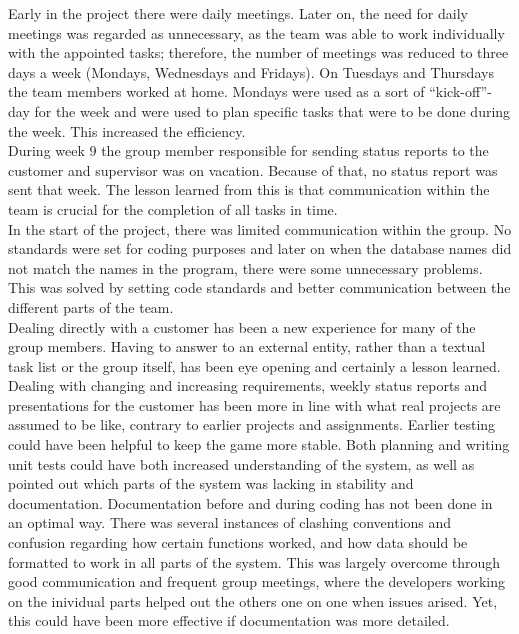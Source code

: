 Early in the project there were daily meetings. Later on, the need for daily meetings was regarded as unnecessary, as the team was able to work individually with the appointed tasks; therefore, the number of meetings was reduced to three days a week (Mondays, Wednesdays and Fridays). On Tuesdays and Thursdays the team members worked at home. Mondays were used as a sort of “kick-off”-day for the week and were used to plan specific tasks that were to be done during the week. This increased the efficiency.\\
\newline
During week 9 the group member responsible for sending status reports to the customer and supervisor was on vacation. Because of that, no status report was sent that week. The lesson learned from this is that communication within the team is crucial for the completion of all tasks in time.\\
\newline
In the start of the project, there was limited communication within the group. No standards were set
for coding purposes and later on when the database names did not match the names in the program, there were some unnecessary problems. This was solved by setting code standards and better communication between the different parts of the team. \\
\newline
Dealing directly with a customer has been a new experience for many of the group members. Having to answer to an external entity, rather than a textual task list or the group itself, has been eye opening and certainly a lesson learned. Dealing with changing and increasing requirements, weekly status reports and presentations for the customer has been more in line with what real projects are assumed to be like, contrary to earlier projects and assignments.
\newline
Earlier testing could have been helpful to keep the game more stable. Both planning and writing unit tests could have both increased understanding of the system, as well as pointed out which parts of the system was lacking in stability and documentation. 
\newline
Documentation before and during coding has not been done in an optimal way. There was several instances of clashing conventions and confusion regarding how certain functions worked, and how data should be formatted to work in all parts of the system. This was largely overcome through good communication and frequent group meetings, where the developers working on the inividual parts helped out the others one on one when issues arised. Yet, this could have been more effective if documentation was more detailed.





